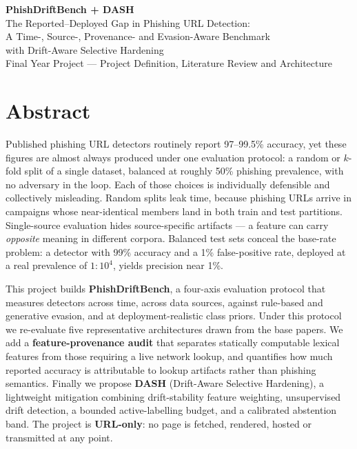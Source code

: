 \documentclass[10pt,a4paper]{article}
\begin{document}
\begin{center}
{\LARGE\bfseries\color{accent} PhishDriftBench + DASH}\\[4mm]
{\large The Reported--Deployed Gap in Phishing URL Detection:\\
A Time-, Source-, Provenance- and Evasion-Aware Benchmark\\
with Drift-Aware Selective Hardening}\\[3mm]
{\small Final Year Project --- Project Definition, Literature Review and Architecture}
\end{center}
\vspace{3mm}

\section{Abstract}

Published phishing URL detectors routinely report 97--99.5\% accuracy, yet these figures are
almost always produced under one evaluation protocol: a random or $k$-fold split of a single
dataset, balanced at roughly 50\% phishing prevalence, with no adversary in the loop. Each of
those choices is individually defensible and collectively misleading. Random splits leak time,
because phishing URLs arrive in campaigns whose near-identical members land in both train and
test partitions. Single-source evaluation hides source-specific artifacts --- a feature can carry
\emph{opposite} meaning in different corpora. Balanced test sets conceal the base-rate problem: a
detector with 99\% accuracy and a 1\% false-positive rate, deployed at a real prevalence of
$1{:}10^{4}$, yields precision near 1\%.

This project builds \textbf{PhishDriftBench}, a four-axis evaluation protocol that measures
detectors across time, across data sources, against rule-based and generative evasion, and at
deployment-realistic class priors. Under this protocol we re-evaluate five representative
architectures drawn from the base papers. We add a \textbf{feature-provenance audit} that
separates statically computable lexical features from those requiring a live network lookup, and
quantifies how much reported accuracy is attributable to lookup artifacts rather than phishing
semantics. Finally we propose \textbf{DASH} (Drift-Aware Selective Hardening), a lightweight
mitigation combining drift-stability feature weighting, unsupervised drift detection, a bounded
active-labelling budget, and a calibrated abstention band. The project is \textbf{URL-only}: no
page is fetched, rendered, hosted or transmitted at any point.
\end{document}

